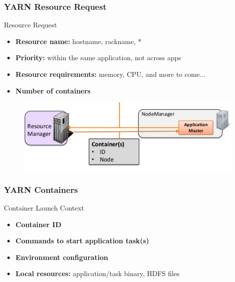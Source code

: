 \begin{frame}
\frametitle{YARN Resource Request}
\begin{block}{Resource Request}
  \begin{itemize}
    \item {\bf Resource name:} hostname, rackname, *
    \item {\bf Priority:} within the same application, not across apps
    \item {\bf Resource requirements:} memory, CPU, and more to come...
    \item {\bf Number of containers}
  \end{itemize}
\end{block}
\begin{figure}[h]
  \centering
  \includegraphics[scale=0.4]{./figures/yarn_resource}
  \label{fig:yarn_resource}
\end{figure}
\end{frame}

\begin{frame}
\frametitle{YARN Containers}
\begin{block}{Container Launch Context}
  \begin{itemize}
    \item {\bf Container ID}
    \item {\bf Commands to start application task(s)}
    \item {\bf Environment configuration}
    \item {\bf Local resources:} application/task binary, HDFS files
  \end{itemize}
\end{block}
\end{frame}

